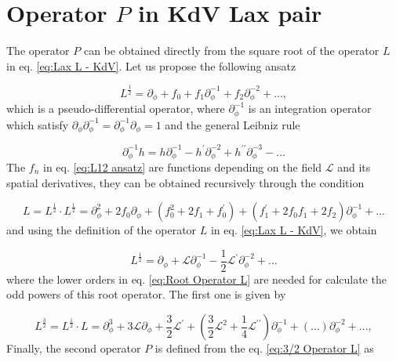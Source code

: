 \documentclass[letterpaper,11pt,oneside]{book}
\begin{document}
\appendix

\chapter{Operator $P$ in KdV Lax pair\label{Appendix 1: Op P}}

The operator $P$ can be obtained directly from the square root of
the operator $L$ in eq. \eqref{eq:Lax L - KdV}. Let us propose the
following ansatz

\begin{equation}
	L^{\frac{1}{2}}=\partial_{\phi}+f_{0}+f_{1}\partial_{\phi}^{-1}+f_{2}\partial_{\phi}^{-2}+\ldots,\label{eq:L12 ansatz}
\end{equation}
which is a pseudo-differential operator, where $\partial_{\phi}^{-1}$
is an integration operator which satisfy $\partial_{\phi}\partial_{\phi}^{-1}=\partial_{\phi}^{-1}\partial_{\phi}=1$
and the general Leibniz rule

\[
\partial_{\phi}^{-1}h=h\partial_{\phi}^{-1}-h^{\prime}\partial_{\phi}^{-2}+h^{\prime\prime}\partial_{\phi}^{-3}-\ldots
\]
The $f_{n}$ in eq. \eqref{eq:L12 ansatz} are functions depending
on the field $\mathcal{L}$ and its spatial derivatives, they can
be obtained recursively through the condition

\[
L=L^{\frac{1}{2}}\cdot L^{\frac{1}{2}}=\partial_{\phi}^{2}+2f_{0}\partial_{\phi}+\left(f_{0}^{2}+2f_{1}+f_{0}^{\prime}\right)+\left(f_{1}^{\prime}+2f_{0}f_{1}+2f_{2}\right)\partial_{\phi}^{-1}+\ldots
\]
and using the definition of the operator $L$ in eq. \eqref{eq:Lax L - KdV},
we obtain

\begin{equation}
	L^{\frac{1}{2}}=\partial_{\phi}+\mathcal{L}\partial_{\phi}^{-1}-\frac{1}{2}\mathcal{L}^{\prime}\partial_{\phi}^{-2}+\ldots\label{eq:Root Operator L}
\end{equation}
where the lower orders in eq. \eqref{eq:Root Operator L} are needed
for calculate the odd powers of this root operator. The first one
is given by 

\begin{equation}
	L^{\frac{3}{2}}=L^{\frac{1}{2}}\cdot L=\partial_{\phi}^{3}+3\mathcal{L}\partial_{\phi}+\frac{3}{2}\mathcal{L}^{\prime}+\left(\frac{3}{2}\mathcal{L}^{2}+\frac{1}{4}\mathcal{L}^{\prime\prime}\right)\partial_{\phi}^{-1}+\left(\ldots\right)\partial_{\phi}^{-2}+\ldots,\label{eq:3/2 Operator L}
\end{equation}
Finally, the second operator $P$ is defined from the eq. \eqref{eq:3/2 Operator L}
as
\end{document}
